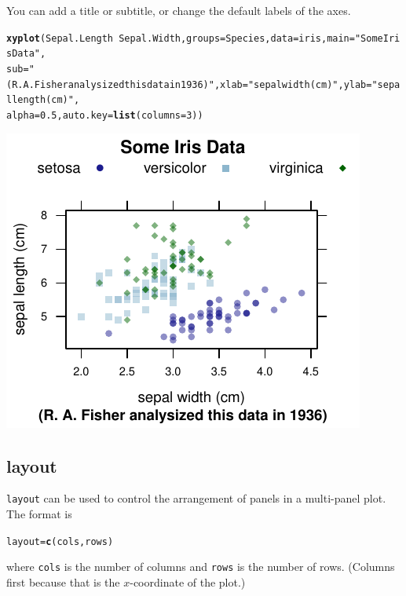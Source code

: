 \documentclass[twoside]{book}\usepackage[]{graphicx}\usepackage[]{xcolor}
\makeatletter
\def\maxwidth{ %
  \ifdim\Gin@nat@width>\linewidth
    \linewidth
  \else
    \Gin@nat@width
  \fi
}
\newcommand{\hlnum}[1]{\textcolor[rgb]{0.686,0.059,0.569}{#1}}%
\newcommand{\hlstr}[1]{\textcolor[rgb]{0.192,0.494,0.8}{#1}}%
\newcommand{\hlopt}[1]{\textcolor[rgb]{0,0,0}{#1}}%
\newcommand{\hlstd}[1]{\textcolor[rgb]{0.345,0.345,0.345}{#1}}%
\newcommand{\hlkwb}[1]{\textcolor[rgb]{0.69,0.353,0.396}{#1}}%
\newcommand{\hlkwc}[1]{\textcolor[rgb]{0.333,0.667,0.333}{#1}}%
\newcommand{\hlkwd}[1]{\textcolor[rgb]{0.737,0.353,0.396}{\textbf{#1}}}%
\newenvironment{kframe}{%
 \def\at@end@of@kframe{}%
 \ifinner\ifhmode%
  \def\at@end@of@kframe{\end{minipage}}%
  \begin{minipage}{\columnwidth}%
 \fi\fi%
 \def\FrameCommand##1{\hskip\@totalleftmargin \hskip-\fboxsep
 \colorbox{shadecolor}{##1}\hskip-\fboxsep
     \hskip-\linewidth \hskip-\@totalleftmargin \hskip\columnwidth}%
 \MakeFramed {\advance\hsize-\width
   \@totalleftmargin\z@ \linewidth\hsize
   \@setminipage}}%
 {\par\unskip\endMakeFramed%
 \at@end@of@kframe}
\newenvironment{knitrout}{}{} %
\newcommand{\option}[1]{{\color{brown!80!black}\texttt{#1}}}
\renewcommand{\code}[1]{{\color{blue!80!black}\texttt{#1}}}
\makeatother
\begin{document}
You can add a title or subtitle, or change the default labels of the axes.
\begin{knitrout}
\color{fgcolor}\begin{kframe}
\begin{alltt}
\hlkwd{xyplot}\hlstd{(Sepal.Length} \hlopt{~} \hlstd{Sepal.Width,} \hlkwc{groups} \hlstd{= Species,} \hlkwc{data} \hlstd{= iris,} \hlkwc{main} \hlstd{=} \hlstr{"Some Iris Data"}\hlstd{,}
    \hlkwc{sub} \hlstd{=} \hlstr{"(R. A. Fisher analysized this data in 1936)"}\hlstd{,} \hlkwc{xlab} \hlstd{=} \hlstr{"sepal width (cm)"}\hlstd{,} \hlkwc{ylab} \hlstd{=} \hlstr{"sepal length (cm)"}\hlstd{,}
    \hlkwc{alpha} \hlstd{=} \hlnum{0.5}\hlstd{,} \hlkwc{auto.key} \hlstd{=} \hlkwd{list}\hlstd{(}\hlkwc{columns} \hlstd{=} \hlnum{3}\hlstd{))}
\end{alltt}
\end{kframe}

{\centering \includegraphics[width=\maxwidth]{figures/fig-iris-xyplot-text-1} 

}



\end{knitrout}

\subsection*{layout}

\option{layout} can be used to control the arrangement of panels in a multi-panel
plot.  The format is
\begin{knitrout}
\color{fgcolor}\begin{kframe}
\begin{alltt}
\hlstd{layout}\hlkwb{=}\hlkwd{c}\hlstd{(cols,rows)}
\end{alltt}
\end{kframe}
\end{knitrout}
where \code{cols} is the number of columns and \code{rows} is the number of 
rows.  (Columns first because that is the $x$-coordinate of the plot.)
\end{document}
